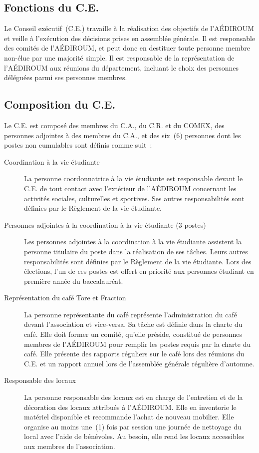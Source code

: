 \documentclass{aediroum}
\begin{document}
\subsection{Fonctions du C.E.}

Le Conseil exécutif~(C.E.) travaille à la réalisation des objectifs de l'AÉDIROUM et veille à l'exécution des décisions prises en assemblée générale. Il est responsable des comités de l'AÉDIROUM, et peut donc en destituer toute personne membre non-élue par une majorité simple. Il est responsable de la représentation de l'AÉDIROUM aux réunions du département, incluant le choix des personnes déléguées parmi ses personnes membres.

\subsection{Composition du C.E.}

Le C.E. est composé des membres du C.A., du C.R. et du COMEX, des personnes adjointes à des membres du C.A., et des six~(6) personnes dont les postes non cumulables sont définis comme suit~:

\begin{description}
    \item[Coordination à la vie étudiante]
        La personne coordonnatrice à la vie étudiante est responsable devant le C.E. de tout contact avec l'extérieur de l'AÉDIROUM concernant les activités sociales, culturelles et sportives. Ses autres responsabilités sont définies par le Règlement de la vie étudiante.

    \item[Personnes adjointes à la coordination à la vie étudiante {\normalfont (3 postes)}]
        Les personnes adjointes à la coordination à la vie étudiante assistent la personne titulaire du poste dans la réalisation de ses tâches.
        Leurs autres responsabilités sont définies par le Règlement de la vie étudiante.
        Lors des élections, l’un de ces postes est offert en priorité aux personnes étudiant en première année du baccalauréat.

    \item[Représentation du café Tore et Fraction]
        La personne représentante du café représente l'administration du café devant l’association et vice-versa.
        Sa tâche est définie dans la charte du café.
        Elle doit former un comité, qu’elle préside, constitué de personnes membres de l'AÉDIROUM pour remplir les postes requis par la charte du café.
        Elle présente des rapports réguliers sur le café lors des réunions du C.E. et un rapport annuel lors de l’assemblée générale régulière d’automne.

    \item[Responsable des locaux]
        La personne responsable des locaux est en charge de l’entretien et de la décoration des locaux attribués à l’AÉDIROUM.
        Elle en inventorie le matériel disponible et recommande l’achat de nouveau mobilier.
        Elle organise au moins une~(1) fois par session une journée de nettoyage du local avec l’aide de bénévoles.
        Au besoin, elle rend les locaux accessibles aux membres de l’association.
\end{description}
\end{document}
